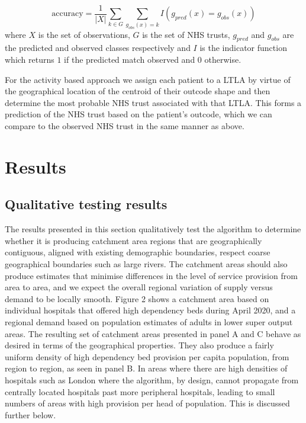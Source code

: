 \documentclass[
]{article}
\begin{document}
\[
\text{accuracy} = \frac{1}{|X|} \sum_{k \in G} \sum_{g_{obs}(x) = k} I \left(g_{pred}(x) = g_{obs}(x)\right)
\] where \(X\) is the set of observations, \(G\) is the set of NHS
trusts, \(g_{pred}\) and \(g_{obs}\) are the predicted and observed
classes respectively and \(I\) is the indicator function which returns
\(1\) if the predicted match observed and \(0\) otherwise.

For the activity based approach we assign each patient to a LTLA by
virtue of the geographical location of the centroid of their outcode
shape and then determine the most probable NHS trust associated with
that LTLA. This forms a prediction of the NHS trust based on the
patient's outcode, which we can compare to the observed NHS trust in the
same manner as above.

\hypertarget{results}{%
\section{Results}\label{results}}

\hypertarget{qualitative-testing-results}{%
\subsection{Qualitative testing
results}\label{qualitative-testing-results}}

The results presented in this section qualitatively test the algorithm
to determine whether it is producing catchment area regions that are
geographically contiguous, aligned with existing demographic boundaries,
respect coarse geographical boundaries such as large rivers. The
catchment areas should also produce estimates that minimise differences
in the level of service provision from area to area, and we expect the
overall regional variation of supply versus demand to be locally smooth.
Figure 2 shows a catchment area based on individual hospitals that
offered high dependency beds during April 2020, and a regional demand
based on population estimates of adults in lower super output areas. The
resulting set of catchment areas presented in panel A and C behave as
desired in terms of the geographical properties. They also produce a
fairly uniform density of high dependency bed provision per capita
population, from region to region, as seen in panel B. In areas where
there are high densities of hospitals such as London where the
algorithm, by design, cannot propagate from centrally located hospitals
past more peripheral hospitals, leading to small numbers of areas with
high provision per head of population. This is discussed further below.
\end{document}

